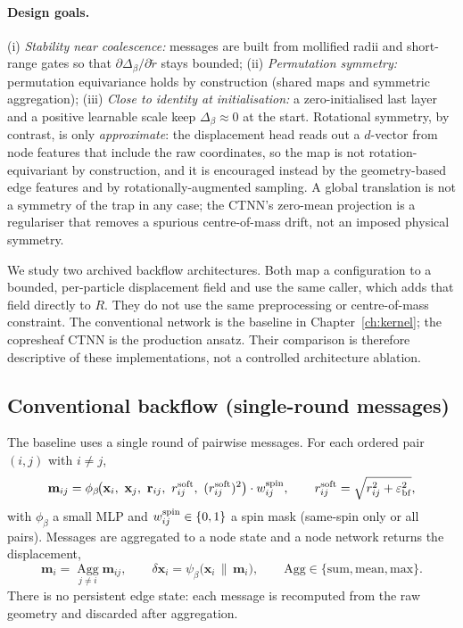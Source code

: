 \paragraph{Design goals.}
(i) \emph{Stability near coalescence:} messages are built from mollified radii and
short-range gates so that $\partial \Delta_\beta/\partial \tilde r$ stays bounded;
(ii) \emph{Permutation symmetry:} permutation equivariance holds by construction (shared
maps and symmetric aggregation);
(iii) \emph{Close to identity at initialisation:} a zero-initialised last layer and a
positive learnable scale keep $\Delta_\beta\!\approx\!0$ at the start.
Rotational symmetry, by contrast, is only \emph{approximate}: the displacement head reads
out a $d$-vector from node features that include the raw coordinates, so the map is not
rotation-equivariant by construction, and it is encouraged instead by the
geometry-based edge features and by rotationally-augmented sampling. A global translation
is not a symmetry of the trap in any case; the CTNN's zero-mean projection is a regulariser
that removes a spurious centre-of-mass drift, not an imposed physical symmetry.

We study two archived backflow architectures. Both map a configuration to a bounded,
per-particle displacement field and use the same caller, which adds that field directly to
$R$. They do not use the same preprocessing or centre-of-mass constraint. The conventional
network is the baseline in Chapter~\ref{ch:kernel}; the copresheaf \textsc{CTNN} is the
production ansatz. Their comparison is therefore descriptive of these implementations, not
a controlled architecture ablation.

\subsection{Conventional backflow (single-round messages)}
The baseline uses a single round of pairwise messages. For
each ordered pair $(i,j)$ with $i\neq j$,
\begin{equation}
  \mathbf m_{ij}
  = \phi_\beta\!\big(
      \mathbf x_i,\ \mathbf x_j,\ \mathbf r_{ij},\
      r_{ij}^{\rm soft},\ (r_{ij}^{\rm soft})^2
    \big)\cdot w_{ij}^{\rm spin},
  \qquad r_{ij}^{\rm soft}=\sqrt{r_{ij}^2+\varepsilon_{\rm bf}^2},
  \label{eq:bf-message}
\end{equation}
with $\phi_\beta$ a small MLP and $w_{ij}^{\rm spin}\in\{0,1\}$ a spin mask (same-spin only
or all pairs). Messages are aggregated to a node state and a node network returns the
displacement,
\begin{equation}
  \mathbf m_i = \operatorname*{Agg}_{j\neq i}\mathbf m_{ij},
  \qquad
  \delta\mathbf x_i = \psi_\beta\!\big(\mathbf x_i \,\|\, \mathbf m_i\big),
  \qquad \mathrm{Agg}\in\{\mathrm{sum},\mathrm{mean},\mathrm{max}\}.
\end{equation}
There is no persistent edge state: each message is recomputed from the raw geometry and
discarded after aggregation.

